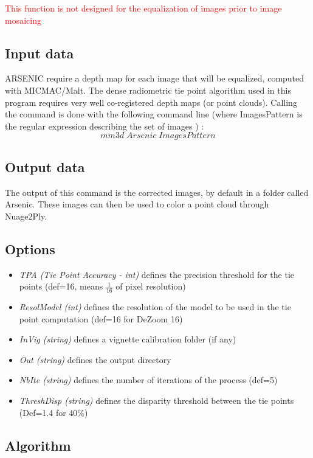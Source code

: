 \textcolor{red}{ This function is not designed for the equalization of images prior to image mosaicing}

\subsection{Input data}
\label{inputArsenic}

ARSENIC require a depth map for each image that will be equalized, computed with MICMAC/Malt. The dense radiometric tie point algorithm used in this program requires very well co-registered depth maps (or point clouds).
Calling the command is done with the following command line (where ImagesPattern is the regular expression describing the set of images ) :\[mm3d\;Arsenic\;ImagesPattern\]

\subsection{Output data}
The output of this command is the corrected images, by default in a folder called Arsenic. These images can then be used to color a point cloud through Nuage2Ply.

\subsection{Options}
\begin{itemize}
\item{\textit{TPA (Tie Point Accuracy - int)} defines the precision threshold for the tie points (def=16, means $\frac{1}{16}$ of pixel resolution)}
\item{\textit{ResolModel (int)} defines the resolution of the model to be used in the tie point computation (def=16 for DeZoom 16)}
\item{\textit{InVig (string)} defines a vignette calibration folder (if any)}
\item{\textit{Out (string)} defines the output directory}
\item{\textit{NbIte (string)} defines the number of iterations of the process (def=5)}
\item{\textit{ThreshDisp (string)} defines the disparity threshold between the tie points (Def=1.4 for 40\%)}
\end{itemize}

\subsection{Algorithm}

